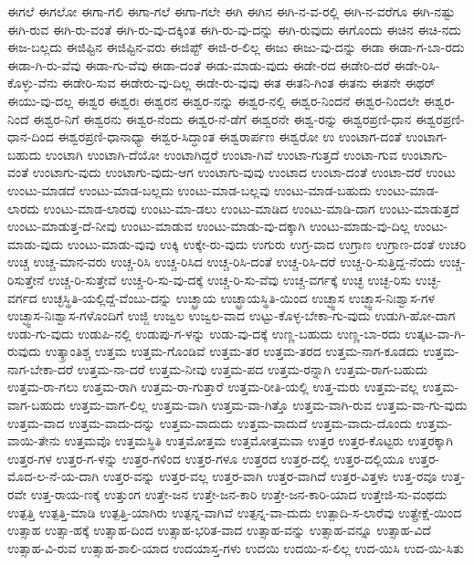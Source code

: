 {ಈಗಲೆ
ಈಗಲೋ
ಈಗಾ-ಗಲಿ
ಈಗಾ-ಗಲೆ
ಈಗಾ-ಗಲೇ
ಈಗಿ
ಈಗಿನ
ಈಗಿ-ನ-ವ-ರಲ್ಲಿ
ಈಗಿ-ನ-ವರೆಗೂ
ಈಗಿ-ನಷ್ಟು
ಈಗಿ-ರುವ
ಈಗಿ-ರು-ವಂತೆ
ಈಗಿ-ರು-ವು-ದಕ್ಕಿಂತ
ಈಗಿ-ರು-ವು-ದನ್ನು
ಈಗಿ-ರುವುದು
ಈಗೊಂದು
ಈಚಿನ
ಈಚಿ-ನದು
ಈಜ-ಬಲ್ಲದು
ಈಜಿಪ್ಟಿನ
ಈಜಿಪ್ಟಿನ-ವರು
ಈಜಿಪ್ಟ್
ಈಜಿ-ರ-ಲಿಲ್ಲ
ಈಜು
ಈಜು-ವು-ದನ್ನು
ಈಡಾ
ಈಡಾ-ಗ-ಬಾ-ರದು
ಈಡಾ-ಗಿ-ರು-ವೆವು
ಈಡಾ-ಗು-ವೆವು
ಈಡಾ-ದಂತೆ
ಈಡು-ಮಾಡು-ವುದು
ಈಡೇ-ರದ
ಈಡೇರಿ-ದರೆ
ಈಡೇ-ರಿಸಿ-ಕೊಳ್ಳು-ವೆನು
ಈಡೇರಿ-ಸುವ
ಈಡೇರು-ವು-ದಿಲ್ಲ
ಈಡೇ-ರು-ವುವು
ಈತ
ಈತನಿ-ಗಿಂತ
ಈತನು
ಈತನೇ
ಈಥರ್
ಈಯು-ವು-ದಲ್ಲ
ಈಶ್ವರ
ಈಶ್ವರಃ
ಈಶ್ವರನ
ಈಶ್ವರ-ನನ್ನು
ಈಶ್ವರ-ನಲ್ಲಿ
ಈಶ್ವರ-ನಿಂದನೆ
ಈಶ್ವರ-ನಿಂದಲೇ
ಈಶ್ವರ-ನಿಂದೆ
ಈಶ್ವರ-ನಿಗೆ
ಈಶ್ವರನು
ಈಶ್ವರ-ನೆಂದು
ಈಶ್ವರ-ನೆ-ಡೆಗೆ
ಈಶ್ವರನೇ
ಈಶ್ವ-ರನ್ನು
ಈಶ್ವರಪ್ರಣಿ-ಧಾನ
ಈಶ್ವರಪ್ರಣಿ-ಧಾನ-ದಿಂದ
ಈಶ್ವರಪ್ರಣಿ-ಧಾನಾಧ್ಯಾ
ಈಶ್ವರ-ಸಿದ್ಧಾಂತ
ಈಶ್ವರಾರ್ಪಣ
ಈಶ್ವರೋ
ಉ
ಉಂಟಾಗ-ದಂತೆ
ಉಂಟಾಗ-ಬಹುದು
ಉಂಟಾಗಿ
ಉಂಟಾಗಿ-ದೆಯೋ
ಉಂಟಾಗಿದ್ದರೆ
ಉಂಟಾ-ಗಿವೆ
ಉಂಟಾ-ಗುತ್ತದೆ
ಉಂಟಾ-ಗುವ
ಉಂಟಾಗು-ವಂತೆ
ಉಂಟಾಗು-ವುದು
ಉಂಟಾಗು-ವುದು-ಆಗ
ಉಂಟಾಗು-ವುವು
ಉಂಟಾದ
ಉಂಟಾ-ದಂತೆ
ಉಂಟಾ-ದರೆ
ಉಂಟು
ಉಂಟು-ಮಾಡದೆ
ಉಂಟು-ಮಾಡ-ಬಲ್ಲದು
ಉಂಟು-ಮಾಡ-ಬಲ್ಲವು
ಉಂಟು-ಮಾಡ-ಬಹುದು
ಉಂಟು-ಮಾಡ-ಲಾರದು
ಉಂಟು-ಮಾಡ-ಲಾರವು
ಉಂಟು-ಮಾ-ಡಲು
ಉಂಟು-ಮಾಡಿದ
ಉಂಟು-ಮಾಡಿ-ದಾಗ
ಉಂಟು-ಮಾಡುತ್ತದೆ
ಉಂಟು-ಮಾಡುತ್ತ-ದೆ-ನೀವು
ಉಂಟು-ಮಾಡುವ
ಉಂಟು-ಮಾಡು-ವು-ದಕ್ಕಾಗಿ
ಉಂಟು-ಮಾಡು-ವು-ದಿಲ್ಲ
ಉಂಟು-ಮಾಡು-ವುದು
ಉಂಟು-ಮಾಡು-ವುವು
ಉಕ್ಕಿ
ಉಕ್ಕೇ-ರು-ವುದು
ಉಗುರು
ಉಗ್ರ-ವಾದ
ಉಗ್ರಾಣ
ಉಗ್ರಾಣ-ದಂತೆ
ಉಚರಿ
ಉಚ್ಚ
ಉಚ್ಚ-ಮಾನ-ವರು
ಉಚ್ಚ-ರಿಸಿ
ಉಚ್ಚ-ರಿಸಿದ
ಉಚ್ಚ-ರಿಸಿ-ದಂತೆ
ಉಚ್ಚ-ರಿಸಿ-ದರೆ
ಉಚ್ಚ-ರಿ-ಸುತ್ತಿದ್ದ-ನೆಂದು
ಉಚ್ಚ-ರಿಸುತ್ತೇನೆ
ಉಚ್ಚ-ರಿ-ಸುತ್ತೇವೆ
ಉಚ್ಚ-ರಿ-ಸು-ವು-ದಕ್ಕೆ
ಉಚ್ಚ-ರಿ-ಸು-ವೆವು
ಉಚ್ಚ-ವರ್ಗಕ್ಕೆ
ಉಚ್ಛ
ಉಚ್ಛ-ರಿಸು
ಉಚ್ಛ-ವರ್ಗದ
ಉಚ್ಛಸ್ಥಿತಿ-ಯಲ್ಲಿದ್ದೆ-ವೆಂಬು-ದನ್ನು
ಉಚ್ಛ್ರಾಯ
ಉಚ್ಛ್ರಾಯಸ್ಥಿತಿ-ಯಿಂದ
ಉಚ್ಛ್ವಾಸ
ಉಚ್ಛ್ವಾಸ-ನಿಃಶ್ವಾಸ-ಗಳ
ಉಚ್ಛ್ವಾಸ-ನಿಃಶ್ವಾಸ-ಗಳೊಂದಿಗೆ
ಉಜ್ಜಿ
ಉಜ್ವಲ
ಉಜ್ವಲ-ವಾದ
ಉಟ್ಟು-ಕೊಳ್ಳ-ಬೇಕಾ-ಗು-ವುದು
ಉಡುಗಿ-ಹೋ-ದಾಗ
ಉಡು-ಗು-ವುದು
ಉಡುಪಿ-ನಲ್ಲಿ
ಉಡುಪು-ಗ-ಳನ್ನು
ಉಡು-ವು-ದಕ್ಕೆ
ಉಣ್ಣ-ಬಹುದು
ಉಣ್ಣ-ಬಾ-ರದು
ಉತ್ಕಟ-ವಾ-ಗಿ-ರುವುದು
ಉತ್ಕ್ರಾಂತಿಶ್ಚ
ಉತ್ತಮ
ಉತ್ತಮ-ಗೊಂಡಿವೆ
ಉತ್ತಮ-ತರ
ಉತ್ತಮ-ತರದ
ಉತ್ತಮ-ನಾಗ-ಕೂಡದು
ಉತ್ತಮ-ನಾಗ-ಬೇಕಾ-ದರೆ
ಉತ್ತಮ-ನಾ-ದರೆ
ಉತ್ತಮ-ನೀವು
ಉತ್ತಮ-ಪದ
ಉತ್ತಮ-ರನ್ನಾಗಿ
ಉತ್ತಮ-ರಾಗ-ಬಹುದು
ಉತ್ತಮ-ರಾ-ಗಲು
ಉತ್ತಮ-ರಾಗಿ
ಉತ್ತಮ-ರಾ-ಗುತ್ತಾರೆ
ಉತ್ತಮ-ರೀತಿ-ಯಲ್ಲಿ
ಉತ್ತ-ಮರು
ಉತ್ತಮ-ವಲ್ಲ
ಉತ್ತಮ-ವಾಗ-ಬಹುದು
ಉತ್ತಮ-ವಾಗ-ಲಿಲ್ಲ
ಉತ್ತಮ-ವಾಗಿ
ಉತ್ತಮ-ವಾ-ಗಿತ್ತೊ
ಉತ್ತಮ-ವಾಗಿ-ರುವ
ಉತ್ತಮ-ವಾ-ಗು-ವುದು
ಉತ್ತಮ-ವಾದ
ಉತ್ತಮ-ವಾದು-ದನ್ನು
ಉತ್ತಮ-ವಾದುದು
ಉತ್ತಮ-ವಾದುದೆ
ಉತ್ತಮ-ವಾದು-ದೊಂದು
ಉತ್ತಮ-ವಾಯಿ-ತೇನು
ಉತ್ತಮವೊ
ಉತ್ತಮಸ್ಥಿತಿ
ಉತ್ತಮೋತ್ತಮ
ಉತ್ತಮೋತ್ತಮವಾ
ಉತ್ತರ
ಉತ್ತರ-ಕೊಟ್ಟರು
ಉತ್ತರಕ್ಕಾಗಿ
ಉತ್ತರ-ಗಳ
ಉತ್ತರ-ಗ-ಳನ್ನು
ಉತ್ತರ-ಗಳಿಂದ
ಉತ್ತರ-ಗಳೂ
ಉತ್ತರದ
ಉತ್ತರ-ದಲ್ಲಿ
ಉತ್ತರ-ದಲ್ಲಿಯೂ
ಉತ್ತರ-ಮೊದ-ಲ-ನೆ-ಯ-ದಾಗಿ
ಉತ್ತರ-ವನ್ನು
ಉತ್ತರ-ವಲ್ಲ
ಉತ್ತರ-ವಾಗಿ
ಉತ್ತರ-ವಾಗಿದೆ
ಉತ್ತರ-ವಿತ್ತಳು
ಉತ್ತ-ರವೂ
ಉತ್ತ-ರವೇ
ಉತ್ತ-ರಾಯ-ಣಕ್ಕೆ
ಉತ್ತುಂಗ
ಉತ್ತೇ-ಜನ
ಉತ್ತೇ-ಜನ-ಕಾರಿ
ಉತ್ತೇ-ಜನ-ಕಾರಿ-ಯಾದ
ಉತ್ತೇಜಿ-ಸು-ವಂಥದು
ಉತ್ಪತ್ತಿ
ಉತ್ಪತ್ತಿ-ಮಾಡಿ
ಉತ್ಪತ್ತಿ-ಯಾಗಿರು
ಉತ್ಪನ್ನ-ವಾಗಿವೆ
ಉತ್ಪನ್ನ-ವಾ-ದುದು
ಉತ್ಪಾದಿ-ಸ-ಲಾರೆವು
ಉತ್ಪ್ರೇಕ್ಷೆ-ಯಿಂದ
ಉತ್ಸಾಹ
ಉತ್ಸಾ-ಹಕ್ಕೆ
ಉತ್ಸಾಹ-ದಿಂದ
ಉತ್ಸಾಹ-ಭರಿತ-ವಾದ
ಉತ್ಸಾಹ-ವನ್ನು
ಉತ್ಸಾಹ-ವನ್ನೂ
ಉತ್ಸಾಹ-ವಿದೆ
ಉತ್ಸಾಹ-ವಿ-ರುವ
ಉತ್ಸಾಹ-ಶಾಲಿ-ಯಾದ
ಉದಯಾಸ್ತ-ಗಳು
ಉದಯಿ
ಉದಯಿ-ಸ-ಲಿಲ್ಲ
ಉದ-ಯಿಸಿ
ಉದ-ಯಿ-ಸಿತು
}
